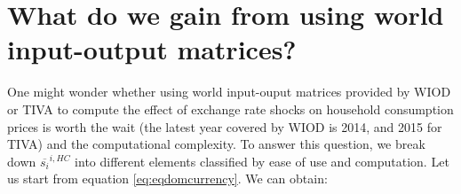 \documentclass[11pt,a4paper]{article}
\begin{document}
%
%
%
%
%

\section{What do we gain from using world input-output matrices?}
One might wonder whether using world input-ouput matrices provided by WIOD or TIVA to compute the effect of exchange rate shocks on household consumption prices is worth the wait (the latest year covered by WIOD is 2014, and 2015 for TIVA) and the computational complexity. To answer this question, we break down $\overline{s_{i}}^{i,HC}$ into different elements classified by ease of use and computation. Let us start from equation \ref{eq:eqdomcurrency}. We can obtain:
\end{document}
